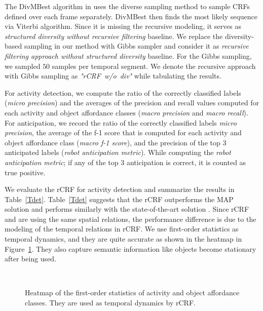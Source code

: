 The DivMBest algorithm in \cite{divmbest} uses the diverse sampling method to sample CRFs defined over each frame separately. DivMBest\cite{divmbest} then finds the most likely sequence via Viterbi algorithm. Since it is missing the recursive modeling, it serves as \emph{structured diversity without recursive filtering} baseline. We replace the diversity-based sampling in our method with Gibbs sampler and consider it as \emph{recursive filtering approach without structured diversity} baseline. For the Gibbs sampling, we sampled $50$ samples per temporal segment. We denote the recursive approach with Gibbs sampling as \emph{\mbox{"rCRF w/o div"}} while tabulating the results.

 For activity detection, we compute the ratio of the correctly classified labels (\emph{micro precision}) and the averages of the precision and recall values computed for each activity and object affordance classes (\emph{macro precision} and \emph{macro recall}). For anticipation, we record the ratio of the correctly classified labels \emph{micro precision}, the average of the f-1 score that is computed for each activity and object affordance class (\emph{macro f-1 score}), and the precision of the top 3 anticipated labels (\emph{robot anticipation metric}). While computing the \emph{robot anticipation metric}; if any of the top 3 anticipation is correct, it is counted as true positive.

We evaluate the rCRF for activity detection and summarize the results in Table~\ref{Tdet}. Table~\ref{Tdet} suggests that the rCRF outperforms the MAP solution \cite{hemaIJRR} and performs similarly with the state-of-the-art solution \cite{latentIcra}. Since rCRF and \cite{hemaIJRR} are using the same spatial relations, the performance difference is due to the modeling of the temporal relations in rCRF. We use \mbox{first-order} statistics as temporal dynamics, and they are quite accurate as shown in the heatmap in Figure~\ref{heatmap}. They also capture semantic information like objects become stationary after being used.

\begin{figure}
  ~
  \caption{Heatmap of the first-order statistics of activity and object affordance classes. They are used as temporal dynamics by rCRF.}
  \label{heatmap}
\end{figure}

